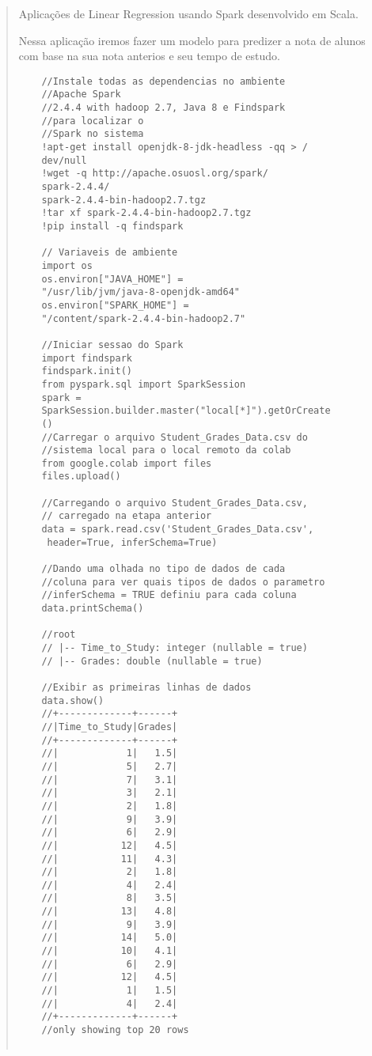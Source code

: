 \begin{quote}
  \hspace{2.5mm} Aplicações de Linear Regression usando Spark desenvolvido em Scala.

  Nessa aplicação iremos fazer um modelo para predizer a nota de alunos com base na sua nota anterios e seu tempo de estudo.
  \cite{9781787122383}
  \begin{lstlisting}
    //Instale todas as dependencias no ambiente
    //Apache Spark
    //2.4.4 with hadoop 2.7, Java 8 e Findspark
    //para localizar o
    //Spark no sistema
    !apt-get install openjdk-8-jdk-headless -qq > /
    dev/null
    !wget -q http://apache.osuosl.org/spark/
    spark-2.4.4/
    spark-2.4.4-bin-hadoop2.7.tgz
    !tar xf spark-2.4.4-bin-hadoop2.7.tgz
    !pip install -q findspark

    // Variaveis de ambiente
    import os
    os.environ["JAVA_HOME"] =
    "/usr/lib/jvm/java-8-openjdk-amd64"
    os.environ["SPARK_HOME"] =
    "/content/spark-2.4.4-bin-hadoop2.7"

    //Iniciar sessao do Spark
    import findspark
    findspark.init()
    from pyspark.sql import SparkSession
    spark =
    SparkSession.builder.master("local[*]").getOrCreate
    ()
    //Carregar o arquivo Student_Grades_Data.csv do
    //sistema local para o local remoto da colab
    from google.colab import files
    files.upload()

    //Carregando o arquivo Student_Grades_Data.csv,
    // carregado na etapa anterior
    data = spark.read.csv('Student_Grades_Data.csv',
     header=True, inferSchema=True)

    //Dando uma olhada no tipo de dados de cada
    //coluna para ver quais tipos de dados o parametro
    //inferSchema = TRUE definiu para cada coluna
    data.printSchema()

    //root
    // |-- Time_to_Study: integer (nullable = true)
    // |-- Grades: double (nullable = true)

    //Exibir as primeiras linhas de dados
    data.show()
    //+-------------+------+
    //|Time_to_Study|Grades|
    //+-------------+------+
    //|            1|   1.5|
    //|            5|   2.7|
    //|            7|   3.1|
    //|            3|   2.1|
    //|            2|   1.8|
    //|            9|   3.9|
    //|            6|   2.9|
    //|           12|   4.5|
    //|           11|   4.3|
    //|            2|   1.8|
    //|            4|   2.4|
    //|            8|   3.5|
    //|           13|   4.8|
    //|            9|   3.9|
    //|           14|   5.0|
    //|           10|   4.1|
    //|            6|   2.9|
    //|           12|   4.5|
    //|            1|   1.5|
    //|            4|   2.4|
    //+-------------+------+
    //only showing top 20 rows


\end{lstlisting}
\end{quote}
